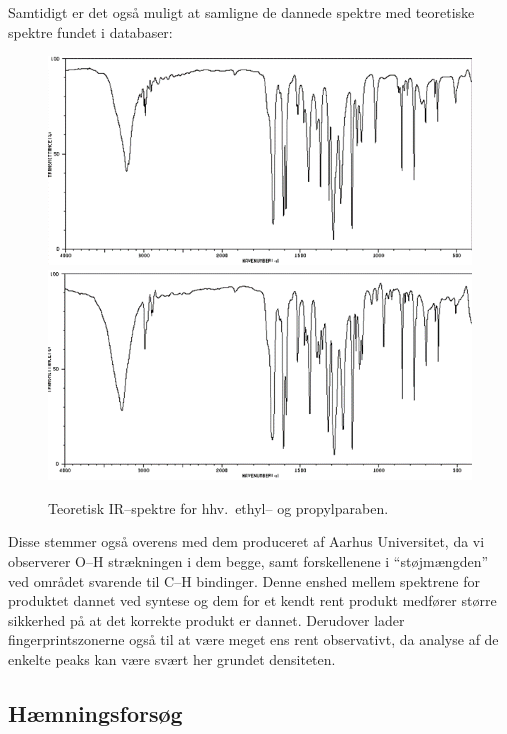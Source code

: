     Samtidigt er det også muligt at samligne de dannede spektre med teoretiske spektre fundet i databaser:
    \begin{figure}[H]
        \includegraphics[width=.48\linewidth]{billeder/irethyl}
        \includegraphics[width=.48\linewidth]{billeder/irpropyl}
        \caption{Teoretisk IR--spektre for hhv.\ ethyl-- og propylparaben.}
    \end{figure}
    Disse stemmer også overens med dem produceret af Aarhus Universitet, da vi observerer O--H strækningen i dem begge, samt forskellenene i ``støjmængden'' ved området svarende til C--H bindinger. Denne enshed mellem spektrene for produktet dannet ved syntese og dem for et kendt rent produkt medfører større sikkerhed på at det korrekte produkt er dannet. Derudover lader fingerprintszonerne også til at være meget ens rent observativt, da analyse af de enkelte peaks kan være svært her grundet densiteten.

    \subsection{Hæmningsforsøg}
